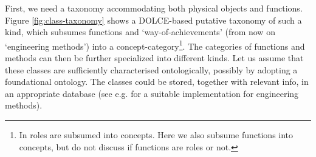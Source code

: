 \documentclass[
]{ceurart}
\begin{document}
First, we need a taxonomy accommodating both physical objects and functions. Figure \ref{fig:class-taxonomy} shows a DOLCE-based \cite{Borgo-FGG22Dolce} putative taxonomy of such a kind, which subsumes functions and `way-of-achievements' (from now on `engineering methods') into a concept-category\footnote{In \cite{Borgo-FGG22Dolce} roles are subsumed into concepts. Here we also subsume functions into concepts, but do not discuss if functions are roles or not.}. %
The categories of functions and methods can then be further specialized into different kinds. 
Let us assume that these classes are sufficiently characterised ontologically, possibly by adopting a foundational ontology. %
The classes could be stored, together with relevant info, in an appropriate database (see e.g. \cite{kitamuraOntologybasedDescriptionFunctional2003} for a suitable implementation for engineering methods).
\end{document}
